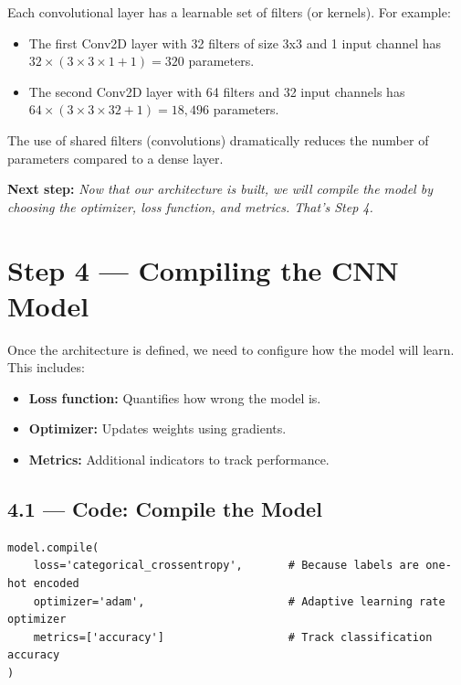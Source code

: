 \documentclass[11pt]{article}
\begin{document}
Each convolutional layer has a learnable set of filters (or kernels). For example:

\begin{itemize}
    \item The first Conv2D layer with 32 filters of size 3x3 and 1 input channel has $32 \times (3 \times 3 \times 1 + 1) = 320$ parameters.
    \item The second Conv2D layer with 64 filters and 32 input channels has $64 \times (3 \times 3 \times 32 + 1) = 18{,}496$ parameters.
\end{itemize}

The use of shared filters (convolutions) dramatically reduces the number of parameters compared to a dense layer.

\vspace{2em}
\noindent\textbf{\Large Next step:} \textit{Now that our architecture is built, we will compile the model by choosing the optimizer, loss function, and metrics. That’s Step 4.}


\section*{Step 4 — Compiling the CNN Model}

Once the architecture is defined, we need to configure how the model will learn. This includes:

\begin{itemize}
    \item \textbf{Loss function:} Quantifies how wrong the model is.
    \item \textbf{Optimizer:} Updates weights using gradients.
    \item \textbf{Metrics:} Additional indicators to track performance.
\end{itemize}

\subsection*{\textbf{4.1 — Code: Compile the Model}}

\begin{verbatim}
model.compile(
    loss='categorical_crossentropy',       # Because labels are one-hot encoded
    optimizer='adam',                      # Adaptive learning rate optimizer
    metrics=['accuracy']                   # Track classification accuracy
)
\end{verbatim}
\end{document}
